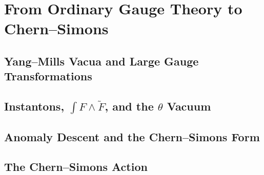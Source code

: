 \section{From Ordinary Gauge Theory to Chern--Simons}
\label{sec:ordinary-to-cs}


\subsection{Yang--Mills Vacua and Large Gauge Transformations}
\label{subsec:ym-vacua-large-gauge}


\subsection{Instantons, $\int F\wedge\tilde F$, and the $\theta$ Vacuum}
\label{subsec:instantons-theta}


\subsection{Anomaly Descent and the Chern--Simons Form}
\label{subsec:anomaly-descent-cs}


\subsection{The Chern--Simons Action}
\label{subsec:cs-action}


